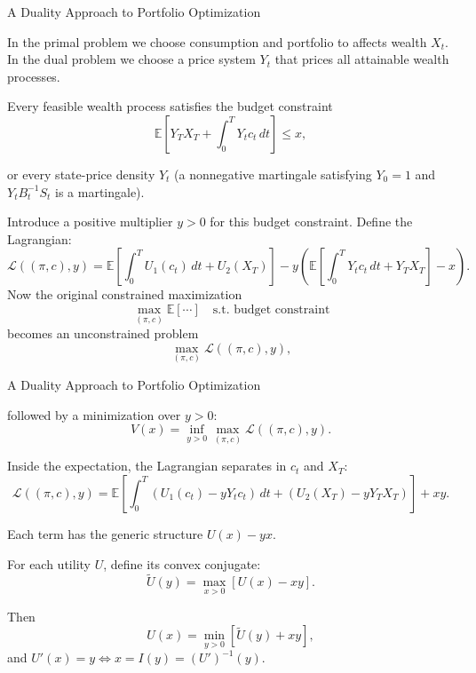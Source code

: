 \documentclass{beamer}
\begin{document}
\begin{frame}{A Duality Approach to Portfolio Optimization}

    {\footnotesize \footnotesize
    \par  In the primal problem we choose consumption and portfolio to affects wealth \(X_t\).
     In the dual problem we choose a price system \(Y_t\) that prices all attainable wealth processes.
    \par Every feasible wealth process satisfies the budget constraint
\[
\mathbb{E}\left[Y_T X_T + \int_0^T Y_t c_t \, dt\right] \leq x,
\]
\par or every state-price density \( Y_t \) (a nonnegative martingale satisfying \( Y_0 = 1 \) and \( Y_t B_t^{-1} S_t \) is a martingale).
\vspace{1em}
\par \pause  Introduce a positive multiplier \( y > 0 \) for this budget constraint. Define the Lagrangian:
\[
\mathcal{L}((\pi, c), y) = \mathbb{E} \left[ \int_0^T U_1(c_t) \, dt + U_2(X_T) \right] - y \left( \mathbb{E} \left[ \int_0^T Y_t c_t \, dt + Y_T X_T \right] - x \right).
\]
Now the original constrained maximization
\[
\max_{(\pi, c)} \mathbb{E} [\cdots] \quad \text{s.t. budget constraint}
\]
becomes an unconstrained problem
\[
\max_{(\pi, c)} \mathcal{L}((\pi, c), y),
\]
    }
\end{frame}


\begin{frame}{A Duality Approach to Portfolio Optimization}

    {\footnotesize \footnotesize
     followed by a minimization over \( y > 0 \):
\[
V(x) = \inf_{y > 0} \max_{(\pi, c)} \mathcal{L}((\pi, c), y).
\]
\par Inside the expectation, the Lagrangian separates in \( c_t \) and \( X_T \):
\[
\mathcal{L}((\pi, c), y) = \mathbb{E} \left[ \int_0^T \left( U_1(c_t) - yY_t c_t \right) \, dt + \left( U_2(X_T) - yY_T X_T \right) \right] + xy.
\]

\par Each term has the generic structure \( U(x) - yx \).
\vspace{1em}
\par  \pause For each utility \( U \), define its convex conjugate:
\[
\tilde{U}(y) = \max_{x>0} [U(x) - xy].
\]

Then
\[
U(x) = \min_{y>0} [\tilde{U}(y) + xy],
\]
and \( U'(x) = y \iff x = I(y) = (U')^{-1}(y) \).

    }
\end{frame}
\end{document}
